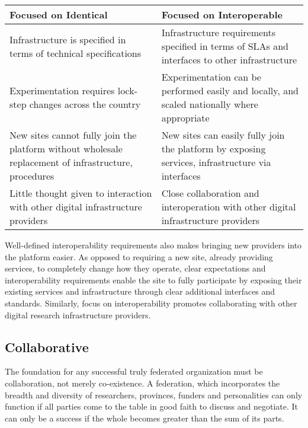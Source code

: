 \documentclass[11pt, letterpaper, twoside]{article}
\begin{document}
\begin{table}[ht] \centering \small {\sffamily
{} \begin{tabular}{P{2.5in}|P{2.5in}}
\textcolor{cdaRed}{\textbf{Focused on Identical}} & \textcolor{cdaRed}{\textbf{Focused on Interoperable}} \\
\hline
\hline 
Infrastructure is specified in terms of technical specifications & Infrastructure requirements specified in terms of SLAs and interfaces to other infrastructure \\
Experimentation requires lock-step changes across the country & Experimentation can be performed easily and locally, and scaled nationally where appropriate \\
New sites cannot fully join the platform without wholesale replacement of infrastructure, procedures & New sites can easily fully join the platform by exposing services, infrastructure via interfaces \\ 
Little thought given to interaction with other digital infrastructure providers & Close collaboration and interoperation with other digital infrastructure providers \\
\hline 
\end{tabular}
}
\end{table}


Well-defined interoperability requirements also makes bringing new
providers into the platform easier. As opposed to requiring a new site,
already providing services, to completely change how they operate, clear
expectations and interoperability requirements enable the site to fully
participate by exposing their existing services and infrastructure
through clear additional interfaces and standards. Similarly, focus on
interoperability promotes collaborating with other digital research
infrastructure providers.

\subsection*{Collaborative}
%

The foundation for any successful truly federated organization must be
collaboration, not merely co-existence.  A federation, which incorporates
the breadth and diversity of researchers, provinces, funders and
personalities can only function if all parties come to the table in good
faith to discuss and negotiate. It can only be a success if the whole
becomes greater than the sum of its parts.
\end{document}
